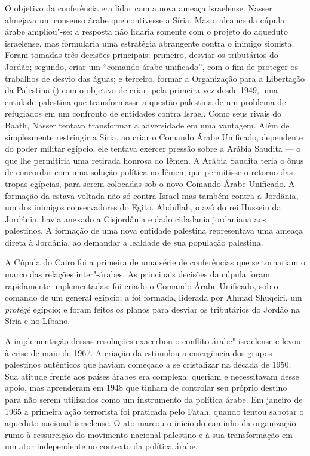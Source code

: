 O objetivo da conferência era lidar com a nova ameaça israelense. Nasser
almejava um consenso árabe que contivesse a Síria. Mas o alcance da
cúpula árabe ampliou"-se: a resposta não lidaria somente com o
projeto do aqueduto israelense, mas formularia uma estratégia abrangente
contra o inimigo sionista. Foram tomadas três decisões principais:
primeiro, desviar os tributários do Jordão; segundo, criar um ``comando
árabe unificado'', com o fim de proteger os trabalhos de desvio das
águas; e terceiro, formar a Organização para a Libertação da Palestina
() com o objetivo de criar, pela primeira vez desde 1949, uma
entidade palestina que transformasse a questão palestina de um problema
de refugiados em um confronto de entidades contra Israel. Como seus
rivais do Baath, Nasser tentava transformar a adversidade em uma
vantagem. Além de simplesmente restringir a Síria, ao criar o Comando
Árabe Unificado, dependente do poder militar egípcio, ele tentava
exercer pressão sobre a Arábia Saudita --- o que lhe permitiria uma
retirada honrosa do Iêmen. A Arábia Saudita teria o ônus de concordar
com uma solução política no Iêmen, que permitisse o retorno das tropas
egípcias, para serem colocadas sob o novo Comando Árabe Unificado. A
formação da  estava voltada não só contra Israel mas também contra a
Jordânia, um dos inimigos conservadores do Egito. Abdullah, o avô do rei
Hussein da Jordânia, havia anexado a Cisjordânia e dado cidadania
jordaniana aos palestinos. A formação de uma nova entidade palestina
representava uma ameaça direta à Jordânia, ao demandar a lealdade de sua
população palestina.

A Cúpula do Cairo foi a primeira de uma série de conferências que se
tornariam o marco das relações inter"-árabes. As principais decisões da
cúpula foram rapidamente implementadas: foi criado o Comando Árabe
Unificado, sob o comando de um general egípcio; a  foi formada,
liderada por Ahmad Shuqeiri, um \emph{protégé} egípcio; e foram feitos
os planos para desviar os tributários do Jordão na Síria e no Líbano.

A implementação dessas resoluções exacerbou o conflito árabe"-israelense
e levou à crise de maio de 1967. A criação da  estimulou a emergência
dos grupos palestinos autênticos que haviam começado a se cristalizar na
década de 1950. Sua atitude frente aos países árabes era complexa:
queriam e necessitavam desse apoio, mas aprenderam em 1948 que tinham de
controlar seu próprio destino para não serem utilizados como um
instrumento da política árabe. Em janeiro de 1965 a primeira ação
terrorista foi praticada pelo Fatah, quando tentou sabotar o aqueduto
nacional israelense. O ato marcou o início do caminho da organização
rumo à ressureição do movimento nacional palestino e à sua transformação
em um ator independente no contexto da política árabe.

